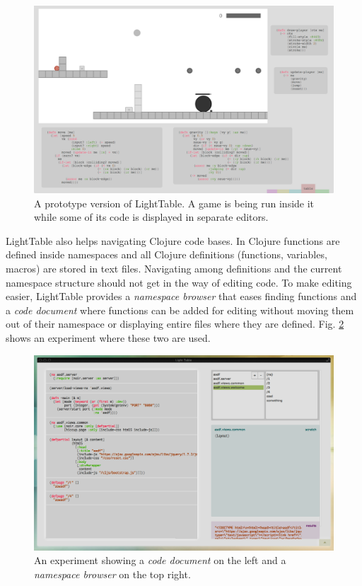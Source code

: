 \documentclass{./llncs2e/llncs}
\begin{document}
	\begin{figure}
	  \centering
	  \includegraphics[width=1.0\textwidth]{img/lt_game_example__inv}
	    \caption{A prototype version of LightTable. A game is being run inside it while some of its code is displayed in separate editors.}
	  \label{fig:lt:draft:table}
	\end{figure} 

	LightTable also helps navigating Clojure code bases.
	In Clojure functions are defined inside namespaces and all Clojure definitions (functions, variables, macros) are stored in text files. 
	Navigating among definitions and the current namespace structure should not get in the way of editing code. 
	To make editing easier, LightTable provides a \emph{namespace browser} that eases finding functions and a \emph{code document} where functions can be added for editing without moving them out of their namespace or displaying entire files where they are defined. 
	Fig. \ref{fig:lt:clojure:table} shows an experiment where these two are used.

	\begin{figure}
	  \centering
	  \includegraphics[width=1.0\textwidth]{img/lt_clojure_table__inv}
	    \caption{An experiment showing a \emph{code document} on the left and a \emph{namespace browser} on the top right.}
	  \label{fig:lt:clojure:table}
	\end{figure} 
\end{document}
